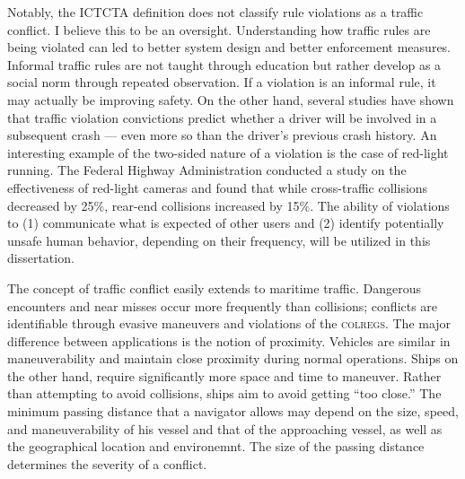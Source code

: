 \documentclass[twoside,symmetric,notoc]{tufte-book}
\begin{document}
\par{%
Notably, the ICTCTA definition does not classify rule violations as a traffic conflict. I believe this to be an oversight. Understanding how traffic rules are being violated can led to better system design and better enforcement measures. Informal traffic rules are not taught through education but rather develop as a social norm through repeated observation.\cite{Deehy} If a violation is an informal rule, it may actually be improving safety. On the other hand, several studies have shown that traffic violation convictions predict whether a driver will be involved in a subsequent crash --- even more so than the driver's previous crash history.\cite{Barraclough} An interesting example of the two-sided nature of a violation is the case of red-light running. The Federal Highway Administration conducted a study on the effectiveness of red-light cameras and found that while cross-traffic collisions decreased by 25\%, rear-end collisions increased by 15\%.\cite{FHWA_redlight} The ability of violations to (1) communicate what is expected of other users and (2) identify potentially unsafe human behavior, depending on their frequency, will be utilized in this dissertation.
}
\par{%
The concept of traffic conflict easily extends to maritime traffic. Dangerous encounters and near misses occur more frequently than collisions; conflicts are identifiable through evasive maneuvers and violations of the \textsc{colregs}. The major difference between applications is the notion of proximity. Vehicles are similar in maneuverability and maintain close proximity during normal operations. Ships on the other hand, require significantly more space and time to maneuver. Rather than attempting to avoid collisions, ships aim to avoid getting ``too close.'' The minimum passing distance that a navigator allows may depend on the size, speed, and maneuverability of his vessel and that of the approaching vessel, as well as the geographical location and environemnt. The size of the passing distance determines the severity of a conflict.\cite{Debnath}
}
\end{document}
